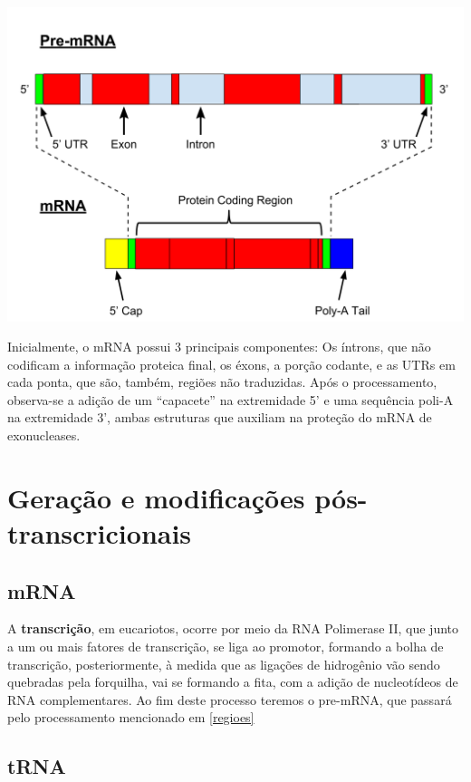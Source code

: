 \documentclass[
]{book}
\begin{document}
\includegraphics{./pics/estruturamrna.png}

Inicialmente, o mRNA possui 3 principais componentes: Os íntrons, que não codificam a informação proteica final, os éxons, a porção codante, e as UTRs em cada ponta, que são, também, regiões não traduzidas. Após o processamento, observa-se a adição de um ``capacete'' na extremidade 5' e uma sequência poli-A na extremidade 3', ambas estruturas que auxiliam na proteção do mRNA de exonucleases.

\hypertarget{gerauxe7uxe3o-e-modificauxe7uxf5es-puxf3s-transcricionais}{%
\section{Geração e modificações pós-transcricionais}\label{gerauxe7uxe3o-e-modificauxe7uxf5es-puxf3s-transcricionais}}

\hypertarget{mrna}{%
\subsection{mRNA}\label{mrna}}

A \textbf{transcrição}, em eucariotos, ocorre por meio da RNA Polimerase II, que junto a um ou mais fatores de transcrição, se liga
ao promotor, formando a bolha de transcrição, posteriormente, à medida que as ligações de hidrogênio vão sendo quebradas pela forquilha, vai se formando a fita, com a adição de nucleotídeos de RNA complementares. Ao fim deste processo teremos o pre-mRNA, que passará pelo processamento mencionado em \ref{regioes}

\hypertarget{trna}{%
\subsection{tRNA}\label{trna}}
\end{document}
